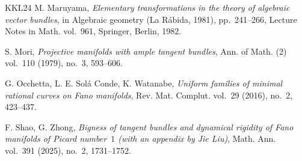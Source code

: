 \documentclass[reqno]{amsart}
\theoremstyle{definition}
\begin{document}
\begin{thebibliography}{KKL24}
    M. Maruyama,
    \textit{Elementary transformations in the theory of algebraic vector bundles},
    in Algebraic geometry (La R\'abida, 1981),
    pp.~241--266, Lecture Notes in Math. vol.~961,
    Springer, Berlin, 1982.

    S. Mori,
    \textit{Projective manifolds with ample tangent bundles},
    Ann. of Math. (2)
    vol.~110 (1979),
    no.~3,
    593--606.

    G. Occhetta, L. E. Sol\'{a} Conde, K. Watanabe,
    \textit{Uniform families of minimal rational curves on Fano manifolds},
    Rev. Mat. Complut.
    vol.~29 (2016),
    no.~2,
    423--437.

    F. Shao, G. Zhong,
    \textit{Bigness of tangent bundles and dynamical rigidity of Fano manifolds of Picard number~$1$ (with an appendix by Jie Liu)},
    Math. Ann.
    vol.~391 (2025),
    no.~2,
    1731--1752.

\end{thebibliography}
\end{document}
